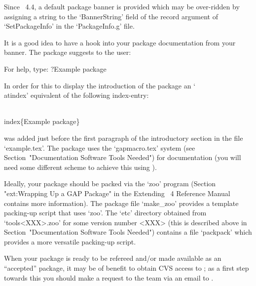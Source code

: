 Since {\GAP}~4.4, a default package  banner  is  provided  which  may  be
over-ridden by assigning a string to  the  `BannerString'  field  of  the
record argument of `SetPackageInfo' in the `PackageInfo.g' file.

It is a good idea to have a hook into  your  package  documentation  from
your banner. The {\Example} package suggests to the {\GAP} user:

\begintt
For help, type: ?Example package
\endtt

In order for this to display the introduction of the  {\Example}  package
an `\\atindex' equivalent of the following index-entry:

\)\\index\{Example package\}

was added just before the first paragraph of the introductory section  in
the file `example.tex'. The {\Example} package  uses  the  `gapmacro.tex'
system  (see   Section~"Documentation   Software   Tools   Needed")   for
documentation (you will need some different scheme to achieve this  using
).


Ideally, your {\GAP} package should  be  packed  via  the  `zoo'  program
(Section "ext:Wrapping Up  a  GAP  Package"  in  the  Extending  {\GAP}~4
Reference Manual contains more information). The {\Example} package  file
`make_zoo' provides a template packing-up script  that  uses  `zoo'.  The
`etc' directory obtained from `tools<XXX>.zoo' for  some  version  number
<XXX> (this is described above in Section~"Documentation  Software  Tools
Needed") contains a file  `packpack'  which  provides  a  more  versatile
packing-up script.


When your package is ready to be refereed and/or  made  available  as  an
``accepted'' {\GAP} package, it may be of benefit to obtain CVS access to
{\GAP}; as a first step towards this you should make  a  request  to  the
{\GAP} team via an email to .

